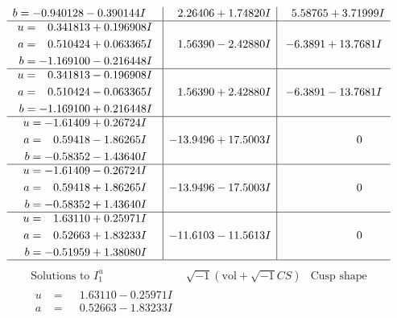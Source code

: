 \documentclass[1p]{elsarticle_modified}
\theoremstyle{definition}
\newcommand{\I}{\sqrt{-1}}
\begin{document}
$$\begin{array}{c|c|c}
\begin{aligned}
b &= -0.940128 - 0.390144 I\end{aligned}
 & \phantom{-}2.26406 + 1.74820 I & \phantom{-}5.58765 + 3.71999 I \\ \hline\begin{aligned}
u &= \phantom{-}0.341813 + 0.196908 I \\
a &= \phantom{-}0.510424 + 0.063365 I \\
b &= -1.169100 - 0.216448 I\end{aligned}
 & \phantom{-}1.56390 - 2.42880 I & -6.3891 + 13.7681 I \\ \hline\begin{aligned}
u &= \phantom{-}0.341813 - 0.196908 I \\
a &= \phantom{-}0.510424 - 0.063365 I \\
b &= -1.169100 + 0.216448 I\end{aligned}
 & \phantom{-}1.56390 + 2.42880 I & -6.3891 - 13.7681 I \\ \hline\begin{aligned}
u &= -1.61409 + 0.26724 I \\
a &= \phantom{-}0.59418 - 1.86265 I \\
b &= -0.58352 - 1.43640 I\end{aligned}
 & -13.9496 + 17.5003 I & \phantom{-0.000000 } 0 \\ \hline\begin{aligned}
u &= -1.61409 - 0.26724 I \\
a &= \phantom{-}0.59418 + 1.86265 I \\
b &= -0.58352 + 1.43640 I\end{aligned}
 & -13.9496 - 17.5003 I & \phantom{-0.000000 } 0 \\ \hline\begin{aligned}
u &= \phantom{-}1.63110 + 0.25971 I \\
a &= \phantom{-}0.52663 + 1.83233 I \\
b &= -0.51959 + 1.38080 I\end{aligned}
 & -11.6103 - 11.5613 I & \phantom{-0.000000 } 0\\
 \hline 
 \end{array}$$\newpage$$\begin{array}{c|c|c}  
\text{Solutions to }I^u_{1}& \I (\text{vol} + \sqrt{-1}CS) & \text{Cusp shape}\\
 \hline 
\begin{aligned}
u &= \phantom{-}1.63110 - 0.25971 I \\
a &= \phantom{-}0.52663 - 1.83233 I \\

\end{aligned}
\end{array}$$
\end{document}
